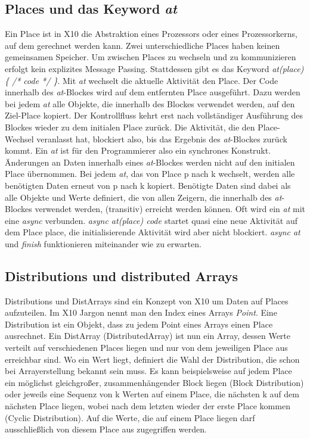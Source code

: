 \subsection{Places und das Keyword \textit{at}} %
\label{sub:places_und_das_keyword_at}
Ein Place ist in X10 die Abstraktion eines Prozessors oder eines Prozessorkerns, auf dem gerechnet werden kann. Zwei unterschiedliche Places haben keinen gemeinsamen Speicher. Um zwischen Places zu wechseln und zu kommunizieren erfolgt kein explizites Message Passing. Stattdessen gibt es das Keyword \textit{at(place) \{ /* code */ \}}. Mit \textit{at} wechselt die aktuelle Aktivität den Place. Der Code innerhalb des \textit{at}-Blockes wird auf dem entfernten Place ausgeführt. Dazu werden bei jedem \textit{at} alle Objekte, die innerhalb des Blockes verwendet werden, auf den Ziel-Place kopiert. Der Kontrollfluss kehrt erst nach vollständiger Ausführung des Blockes wieder zu dem initialen Place zurück. Die Aktivität, die den Place-Wechsel veranlasst hat, blockiert also, bis das Ergebnis des \textit{at}-Blockes zurück kommt. Ein \textit{at} ist für den Programmierer also ein synchrones Konstrukt. Änderungen an Daten innerhalb eines \textit{at}-Blockes werden nicht auf den initialen Place übernommen. Bei jedem \textit{at}, das von Place p nach k wechselt, werden alle benötigten Daten erneut von p nach k kopiert. Benötigte Daten sind dabei als alle Objekte und Werte definiert, die von allen Zeigern, die innerhalb des \textit{at}-Blockes verwendet werden, (transitiv) erreicht werden können. Oft wird ein \textit{at} mit eine \textit{async} verbunden. \textit{async at(place) { code }} startet quasi eine neue Aktivität auf dem Place place, die initialisierende Aktivität wird aber nicht blockiert. \textit{async at} und \textit{finish} funktionieren miteinander wie zu erwarten. \cite{x10Spec:2012:Online}

\subsection{Distributions und distributed Arrays} %
\label{sub:distributions_und_distributed_arrays}
Distributions und DistArrays sind ein Konzept von X10 um Daten auf Places aufzuteilen. Im X10 Jargon nennt man den Index eines Arrays \textit{Point}. Eine Distribution ist ein Objekt, dass zu jedem Point eines Arrays einen Place ausrechnet. Ein DistArray (DistributedArray) ist nun ein Array, dessen Werte verteilt auf verschiedenen Places liegen und nur von dem jeweiligen Place aus erreichbar sind. Wo ein Wert liegt, definiert die Wahl der Distribution, die schon bei Arrayerstellung bekannt sein muss. Es kann beispielsweise auf jedem Place ein möglichst gleichgroßer, zusammenhängender Block liegen (Block Distribution) oder jeweils eine Sequenz von k Werten auf einem Place, die nächsten k auf dem nächsten Place liegen, wobei nach dem letzten wieder der erste Place kommen (Cyclic Distribution). Auf die Werte, die auf einem Place liegen darf ausschließlich von diesem Place aus zugegriffen werden. \cite{x10Spec:2012:Online}

